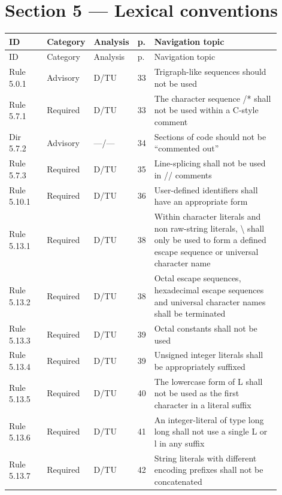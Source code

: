 \documentclass[10pt,letterpaper]{article}
\begin{document}
\section{Section 5 --- Lexical conventions}
\small\setlength{\tabcolsep}{3pt}\renewcommand{\arraystretch}{1.15}
\begin{longtable}{p{0.14\linewidth}p{0.14\linewidth}p{0.1\linewidth}p{0.045\linewidth}p{0.475\linewidth}}
\toprule
ID & Category & Analysis & p. & Navigation topic\\ \midrule
\endfirsthead
\toprule
ID & Category & Analysis & p. & Navigation topic\\ \midrule
\endhead
Rule 5.0.1 & Advisory & D/TU & 33 & Trigraph-like sequences should not be used\\
Rule 5.7.1 & Required & D/TU & 33 & The character sequence /* shall not be used within a C-style comment\\
Dir 5.7.2 & Advisory & ---/--- & 34 & Sections of code should not be ``commented out''\\
Rule 5.7.3 & Required & D/TU & 35 & Line-splicing shall not be used in // comments\\
Rule 5.10.1 & Required & D/TU & 36 & User-defined identifiers shall have an appropriate form\\
Rule 5.13.1 & Required & D/TU & 38 & Within character literals and non raw-string literals, \textbackslash{} shall only be used to form a defined escape sequence or universal character name\\
Rule 5.13.2 & Required & D/TU & 38 & Octal escape sequences, hexadecimal escape sequences and universal character names shall be terminated\\
Rule 5.13.3 & Required & D/TU & 39 & Octal constants shall not be used\\
Rule 5.13.4 & Required & D/TU & 39 & Unsigned integer literals shall be appropriately suffixed\\
Rule 5.13.5 & Required & D/TU & 40 & The lowercase form of L shall not be used as the first character in a literal suffix\\
Rule 5.13.6 & Required & D/TU & 41 & An integer-literal of type long long shall not use a single L or l in any suffix\\
Rule 5.13.7 & Required & D/TU & 42 & String literals with different encoding prefixes shall not be concatenated\\
\bottomrule
\end{longtable}
\normalsize
\end{document}
